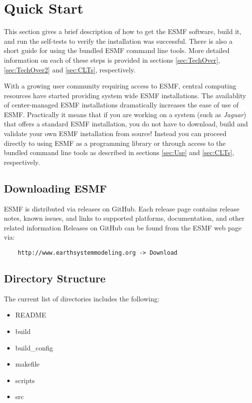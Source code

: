 \section{Quick Start}
\label{sec:QuickStart}

This section gives a brief description of how to get the ESMF software, build 
it, and run the self-tests to verify the installation was successful. There is 
also a short guide for using the bundled ESMF command line tools. More detailed 
information on each of these steps is provided in sections \ref{sec:TechOver},
 \ref{sec:TechOver2} and \ref{sec:CLTs}, respectively.

With a growing user community requiring access to ESMF, central computing 
resources have started providing system wide ESMF installations. The availablity 
of center-managed ESMF installations dramatically increases the ease of use of 
ESMF. Practically it means that if you are working on a system (such as 
{\it Jaguar}) that offers a standard ESMF installation, you do not have to 
download, build and validate your own ESMF installation from source! Instead you 
can proceed directly to using ESMF as a programming library or through access to 
the bundled command line tools as described in sections \ref{sec:Use} and 
\ref{sec:CLTs}, respectively.

\subsection{Downloading ESMF}
\label{sec:download}
ESMF is distributed via releases on GitHub. Each release page contains release notes,
known issues, and links to supported platforms, documentation, and other related information
Releases on GitHub can be found from the ESMF web page via:
\begin{verbatim}
    http://www.earthsystemmodeling.org -> Download
\end{verbatim}

\subsection{Directory Structure}
The current list of directories includes the following:
\begin{itemize}
\item README
\item build
\item build\_config
\item makefile
\item scripts
\item src
\end{itemize}

